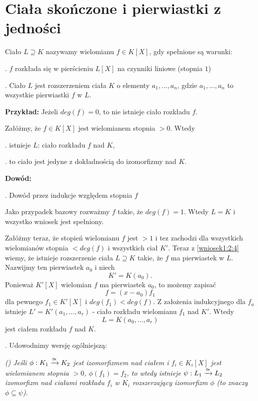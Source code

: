 \section{Ciała skończone i pierwiastki z jedności}

\begin{important}
Ciało $L\supseteq K$ nazywamy  wielomianu $f\in K[X]$, gdy spełnione są warunki:

. $f$ rozkłada się w pierścieniu $L[X]$ na czynniki liniowe (stopnia $1$)

. Ciało $L$ jest rozszerzeniem ciała $K$ o elementy $a_1,...,a_n$, gdzie $a_1,...,a_n$ to wszystkie pierwiastki $f$ w $L$.
\end{important}

\textbf{Przykład:} Jeżeli $deg(f)=0$, to nie istnieje ciało rozkładu $f$.

\begin{wniosek}
    \label{wniosek:2.1}
    Załóżmy, że $f\in K[X]$ jest wielomianem stopnia $>0$. Wtedy

. istnieje $L$: ciało rozkładu $f$ nad $K$,

. to ciało jest jedyne z dokładnością do izomorfizmy nad $K$.
\end{wniosek}

\textbf{Dowód:}

. Dowód przez indukcje względem stopnia $f$

Jako przypadek bazowy rozważmy $f$ takie, że $deg(f)=1$. Wtedy $L=K$ i wszystko wniosek jest spełniony.

Załóżmy teraz, że stopień wielomianu $f$ jest $>1$ i tez zachodzi dla wszystkich wielomianów stopnia $<deg(f)$ i wszystkich ciał $K'$. Teraz z \ref{wniosek1:2:4} wiemy, że istnieje rozszerzenie ciała $L\supseteq K$ takie, że $f$ ma pierwiastek w $L$. Nazwijmy ten pierwiastek $a_0$ i niech
$$K'=K(a_0).$$
Ponieważ $K'[X]$ wielomian $f$ ma pierwiastek $a_0$, to możemy zapisać
$$f=(x-a_0)f_1$$
dla pewnego $f_1\in K'[X]$ i $deg(f_1)<deg(f)$. Z założenia indukcyjnego dla $f_a$ istnieje $L'=K'(a_1,...,a_r)$ - ciało rozkładu wielomianu $f_1$ nad $K'$. Wtedy 
$$L=K(a_0,...,a_r)$$
jest ciałem rozkładu $f$ nad $K$.

. Udowodnimy wersję ogólniejszą: 
\label{stwierdzenie:wniosek}

\emph{(\bat) Jeśli $\phi:K_1\xrightarrow[]{\cong} K_2$ jest izomorfizmem nad ciałem i $f_i\in K_i[X]$ jest wielomianem stopnia $>0$, $\phi(f_1)=f_2$, to wtedy istnieje $ \psi:L_1\xrightarrow[]{\cong} L_2$ izomorfizm nad ciałami rozkładu $f_i$ w $K_i$ rozszerzający izomorfizm $\phi$ (to znaczy $\phi\subseteq \psi$).}

